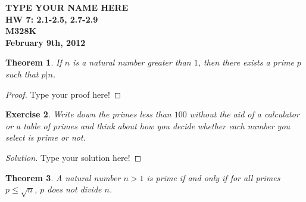 \documentclass[12pt,leqno]{article}
\numberwithin{equation}{section}
\newtheorem{thm}{Theorem}[section]
\newtheorem{exer}[thm]{Exercise}
\theoremstyle{definition}
\begin{document}
\thispagestyle{plain}
\begin{flushright}
\large{\textbf{TYPE YOUR NAME HERE \\
HW 7: 2.1-2.5, 2.7-2.9\\
M328K \\
February 9th, 2012 \\}}
\end{flushright}

\markboth{}{} \setcounter{section}{0} \baselineskip=18pt

\setcounter{tocdepth}{4}



\setcounter{section}{2}

\setcounter{thm}{0}

\begin{thm}
If $n$ is a natural number greater than $1$, then there exists a
prime $p$ such that $p|n$.
\end{thm}

\begin{proof}[Proof]
Type your proof here!
\end{proof}


\begin{exer}
Write down the primes less than $100$ without the aid of a
calculator or a table of primes and think about how you decide
whether each number you select is prime or not.
\end{exer}

\begin{proof}[Solution]
Type your solution here!
\end{proof}


\begin{thm}
A natural number $n>1$ is prime if and only if for all primes $p
\leq \sqrt{n}$, $p$ does not divide $n$.
\end{thm}
\end{document}
